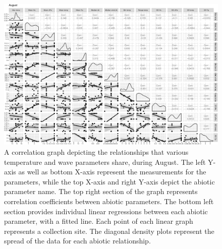 \documentclass[10pt,a4,]{article}
\makeatletter
\def\maxwidth{\ifdim\Gin@nat@width>\linewidth\linewidth
\else\Gin@nat@width\fi}
\let\Oldincludegraphics\includegraphics
\renewcommand{\includegraphics}[1]{\Oldincludegraphics[width=\maxwidth]{#1}}
\makeatother
\begin{document}
\begin{figure}
\centering
\includegraphics{chapter_2_files/figure-latex/unnamed-chunk-22-1.pdf}
\caption{A correlation graph depicting the relationships that various
temperature and wave parameters share, during August. The left Y-axis as
well as bottom X-axis represent the measurements for the parameters,
while the top X-axis and right Y-axis depict the abiotic parameter name.
The top right section of the graph represents correlation coefficients
between abiotic parameters. The bottom left section provides individual
linear regressions between each abiotic parameter, with a fitted line.
Each point of each linear graph represents a collection site. The
diagonal density plots represent the spread of the data for each abiotic
relationship.}
\end{figure}
\end{document}
